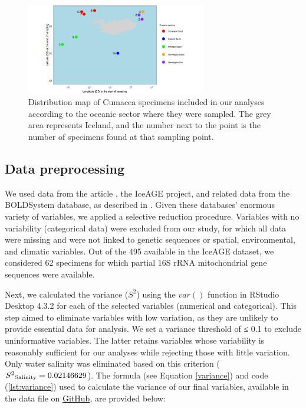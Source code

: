 \begin{figure}[htbp]
    \centering
    \includegraphics[width=0.7\textwidth]{figuremap.png}
    \caption{Distribution map of Cumacea specimens included in our analyses according to the oceanic sector where they were sampled. The grey area represents Iceland, and the number next to the point is the number of specimens found at that sampling point. \label{fig:fig2}}
\end{figure}

\subsection{Data preprocessing}
We used data from the article \citep{uhlir_adding_2021}, the IceAGE project, and related data from the BOLDSystem database, as described in \citep{uhlir_adding_2021}. Given these databases' enormous variety of variables, we applied a selective reduction procedure. Variables with no variability (categorical data) were excluded from our study, for which all data were missing and were not linked to genetic sequences or spatial, environmental, and climatic variables. Out of the 495 available in the IceAGE dataset, we considered 62 specimens for which partial 16S rRNA mitochondrial gene sequences were available.

Next, we calculated the variance ($S^2$) using the $var()$ function in RStudio Desktop 4.3.2 for each of the selected variables (numerical and categorical). This step aimed to eliminate variables with low variation, as they are unlikely to provide essential data for analysis. We set a variance threshold of ≤ 0.1 to exclude uninformative variables. The latter retains variables whose variability is reasonably sufficient for our analyses while rejecting those with little variation. Only water salinity was eliminated based on this criterion ($S^2\textsubscript{Salinity} = 0.02146629$). The formula (see Equation \ref{variance}) and code (\autoref{lst:variance}) used to calculate the variance of our final variables, available in the data file on \href{https://github.com/tahiri-lab/Cumacea_aPhyloGeo}{GitHub}, are provided below:

